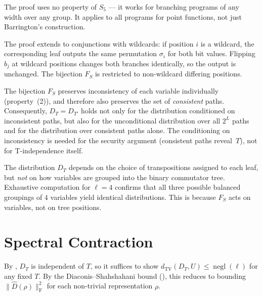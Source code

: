 \documentclass[version=submission]{iacrcc}
\DeclareMathOperator{\negl}{negl}
\newcommand{\norm}[1]{\lVert #1 \rVert}
\newcommand{\frob}[1]{\norm{#1}_{\mathrm{F}}}
\newcommand{\dtv}{d_{\mathrm{TV}}}
\newcommand{\Dhat}{\widehat{D}}
\begin{document}
\begin{remark}
The proof uses no property of $S_5$ --- it works for branching programs of
any width over any group. It applies to all programs for point functions,
not just Barrington's construction.
\end{remark}

\begin{remark}
The proof extends to conjunctions with wildcards: if position $i$ is a wildcard,
the corresponding leaf outputs the same permutation $\sigma_i$ for both bit values.
Flipping $b_j$ at wildcard positions changes both branches identically, so the output
is unchanged. The bijection $F_S$ is restricted to non-wildcard differing positions.
\end{remark}

\begin{remark}
\label{rem:unconditional}
The bijection $F_S$ preserves inconsistency of each variable individually
(property~(2)), and therefore also preserves the set of \emph{consistent}
paths. Consequently, $D_T = D_{T'}$ holds not only for the distribution
conditioned on inconsistent paths, but also for the unconditional distribution
over all $2^L$ paths and for the distribution over consistent paths alone.
The conditioning on inconsistency is needed for the security argument
(consistent paths reveal~$T$), not for T-independence itself.
\end{remark}

\begin{remark}
\label{rem:grouping}
The distribution $D_T$ depends on the choice of transpositions assigned to
each leaf, but \emph{not} on how variables are grouped into the binary
commutator tree. Exhaustive computation for $\ell = 4$ confirms that all
three possible balanced groupings of $4$ variables yield identical distributions.
This is because $F_S$ acts on variables, not on tree positions.
\end{remark}


\section{Spectral Contraction}
\label{sec:contraction}

By , $D_T$ is independent of $T$, so it suffices to show
$\dtv(D_T, U) \leq \negl(\ell)$ for any fixed $T$. By the
Diaconis--Shahshahani bound (), this reduces to bounding
$\frob{\Dhat(\rho)}^2$ for each non-trivial representation $\rho$.
\end{document}
